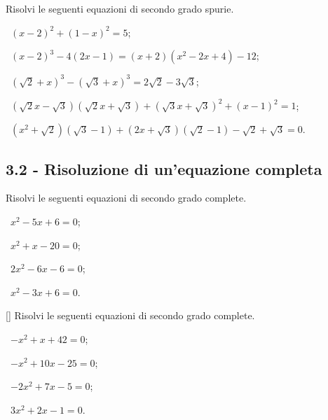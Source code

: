 \begin{esercizio}[\Ast]
 \label{ese:3.11}
Risolvi le seguenti equazioni di secondo grado spurie.
 \begin{enumeratea}
 \item~$(x - 2)^{2} + (1 - x)^{2} = 5$;
 \item~$(x - 2)^{3} - 4 (2 x - 1) = (x + 2) \left(x^{2} - 2 x + 4\right) - 12$;
 \item~$(\sqrt{2} + x)^{3} - (\sqrt{3} + x)^{3} = 2 \sqrt{2} - 3\sqrt{3}$;
 \item~$(\sqrt{2} x - \sqrt{3}) (\sqrt{2} x + \sqrt{3}) + (\sqrt{3} x + \sqrt{3})^{2} + (x - 1)^{2} = 1$;
 \item~$\left(x^{2} + \sqrt{2} \right) (\sqrt{3} - 1) + (2 x +\sqrt{3}) (\sqrt{2} - 1) - \sqrt{2} + \sqrt{3} = 0$.
 \end{enumeratea}
\end{esercizio}

\subsection*{3.2 - Risoluzione di un'equazione completa}
\begin{esercizio}[\Ast]
 \label{ese:3.12}
Risolvi le seguenti equazioni di secondo grado complete.
\begin{multicols}{2}
 \begin{enumeratea}
 \item~$x^{2}-5 x + 6=0$;
 \item~$x^{2} + x-20=0$;
 \item~$2 x^{2}-6 x-6=0$;
 \item~$x^{2}-3 x + 6=0$.
 \end{enumeratea}
 \end{multicols}
\end{esercizio}

\begin{esercizio}
 \label{ese:3.13}[\Ast]
Risolvi le seguenti equazioni di secondo grado complete.
\begin{multicols}{2}
 \begin{enumeratea}
 \item~$- x^{2} + x + 42=0$;
 \item~$- x^{2} + 10 x-25=0$;
 \item~$- 2 x^{2} + 7 x-5=0$;
 \item~$3 x^{2} + 2 x-1=0$.
 \end{enumeratea}
 \end{multicols}
\end{esercizio}

